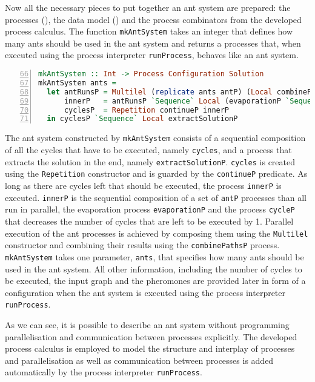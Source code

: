 Now all the necessary pieces to put together an ant system are prepared: the processes (), the data model () and the process combinators from the developed process calculus. The function \texttt{mkAntSystem} takes an integer that defines how many ants should be used in the ant system and returns a processes that, when executed using the process interpreter \texttt{runProcess}, behaves like an ant system.

\begin{lstlisting}[language=Haskell,frame=tb,numbers=left,firstnumber=66,label=lst:ant_system_complete,caption=Transformation of a configuration for an ant system into a process hierarchy., basicstyle=\footnotesize\ttfamily]
mkAntSystem :: Int -> Process Configuration Solution
mkAntSystem ants =
  let antRunsP = Multilel (replicate ants antP) (Local combinePathsP)
      innerP   = antRunsP `Sequence` Local (evaporationP `Sequence` cycleP)
      cyclesP  = Repetition continueP innerP
  in cyclesP `Sequence` Local extractSolutionP
\end{lstlisting}

The ant system constructed by \texttt{mkAntSystem} consists of a sequential composition of all the cycles that have to be executed, namely \texttt{cycles}, and a process that extracts the solution in the end, namely \texttt{extractSolutionP}. \texttt{cycles} is created using the \texttt{Repetition} constructor and is guarded by the \texttt{continueP} predicate. As long as there are cycles left that should be executed, the process \texttt{innerP} is executed. \texttt{innerP} is the sequential composition of a set of \texttt{antP} processes than all run in parallel, the evaporation process \texttt{evaporationP} and the process \texttt{cycleP} that decreases the number of cycles that are left to be executed by 1. Parallel execution of the ant processes is achieved by composing them using the \texttt{Multilel} constructor and combining their results using the \texttt{combinePathsP} process. \texttt{mkAntSystem} takes one parameter, \texttt{ants}, that specifies how many ants should be used in the ant system. All other information, including the number of cycles to be executed, the input graph and the pheromones are provided later in form of a configuration when the ant system is executed using the process interpreter \texttt{runProcess}.

As we can see, it is possible to describe an ant system without programming parallelisation and communication between processes explicitly. The developed process calculus is employed to model the structure and interplay of processes and parallelisation as well as communication between processes is added automatically by the process interpreter \texttt{runProcess}.